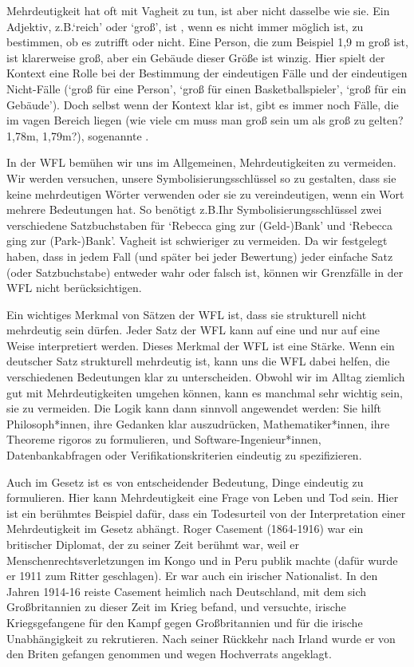Mehrdeutigkeit hat oft mit Vagheit zu tun, ist aber nicht dasselbe wie sie. Ein Adjektiv, z.B.\@ `reich' oder `gro{\ss}', ist , wenn es nicht immer möglich ist, zu bestimmen, ob es zutrifft oder nicht. Eine Person, die zum Beispiel 1,9 m gro{\ss} ist, ist klarerweise gro{\ss}, aber ein Gebäude dieser Grö{\ss}e ist winzig.  Hier spielt der Kontext eine Rolle bei der Bestimmung der eindeutigen Fälle und der eindeutigen Nicht-Fälle (`gro{\ss} für eine Person', `gro{\ss} für einen Basketballspieler', `gro{\ss} für ein Gebäude'). Doch selbst wenn der Kontext klar ist, gibt es immer noch Fälle, die im vagen Bereich liegen (wie viele cm muss man gro{\ss} sein um als gro{\ss} zu gelten? 1,78m, 1,79m?), sogenannte .

In der WFL bemühen wir uns im Allgemeinen, Mehrdeutigkeiten zu vermeiden. Wir werden versuchen, unsere Symbolisierungsschlüssel so zu gestalten, dass sie keine mehrdeutigen Wörter verwenden oder sie zu vereindeutigen, wenn ein Wort mehrere Bedeutungen hat. So benötigt z.B.\@ Ihr Symbolisierungsschlüssel zwei verschiedene Satzbuchstaben für `Rebecca ging zur (Geld-)Bank' und `Rebecca ging zur (Park-)Bank'. Vagheit ist schwieriger zu vermeiden. Da wir festgelegt haben, dass in jedem Fall (und später bei jeder Bewertung) jeder einfache Satz (oder Satzbuchstabe) entweder wahr oder falsch ist, können wir Grenzfälle in der WFL nicht berücksichtigen.

Ein wichtiges Merkmal von Sätzen der WFL ist, dass sie strukturell nicht mehrdeutig sein dürfen. Jeder Satz der WFL kann auf eine und nur auf eine Weise interpretiert werden. Dieses Merkmal der WFL ist eine Stärke. Wenn ein deutscher Satz strukturell mehrdeutig ist, kann uns die WFL dabei helfen, die verschiedenen Bedeutungen klar zu unterscheiden. Obwohl wir im Alltag ziemlich gut mit Mehrdeutigkeiten umgehen können, kann es manchmal sehr wichtig sein, sie zu vermeiden. Die Logik kann dann sinnvoll angewendet werden: Sie hilft Philosoph*innen, ihre Gedanken klar auszudrücken, Mathematiker*innen, ihre Theoreme rigoros zu formulieren, und Software-Ingenieur*innen, Datenbankabfragen oder Verifikationskriterien eindeutig zu spezifizieren. 

Auch im Gesetz ist es von entscheidender Bedeutung, Dinge eindeutig zu formulieren. Hier kann Mehrdeutigkeit eine Frage von Leben und Tod sein. Hier ist ein berühmtes Beispiel dafür, dass ein Todesurteil von der Interpretation einer Mehrdeutigkeit im Gesetz abhängt. Roger Casement (1864-1916) war ein britischer Diplomat, der zu seiner Zeit berühmt war, weil er Menschenrechtsverletzungen im Kongo und in Peru publik machte (dafür wurde er 1911 zum Ritter geschlagen). Er war auch ein irischer Nationalist. In den Jahren 1914-16 reiste Casement heimlich nach Deutschland, mit dem sich Gro{\ss}britannien zu dieser Zeit im Krieg befand, und versuchte, irische Kriegsgefangene für den Kampf gegen Gro{\ss}britannien und für die irische Unabhängigkeit zu rekrutieren. Nach seiner Rückkehr nach Irland wurde er von den Briten gefangen genommen und wegen Hochverrats angeklagt.

